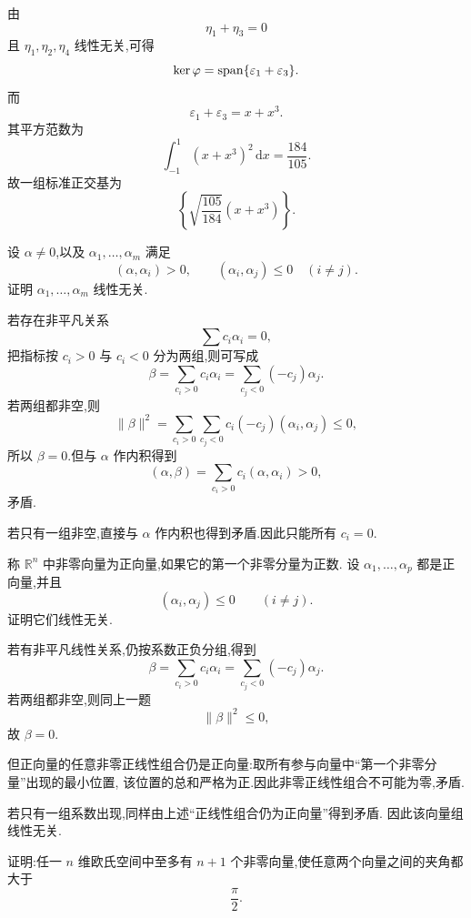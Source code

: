 \begin{solution}
由
\[
\eta_1+\eta_3=0
\]
且 $\eta_1,\eta_2,\eta_4$ 线性无关,可得
\[
\ker\varphi
=
\operatorname{span}\{\varepsilon_1+\varepsilon_3\}.
\]
而
\[
\varepsilon_1+\varepsilon_3=x+x^3.
\]
其平方范数为
\[
\displaystyle\int_{-1}^{1}(x+x^3)^2\,\mathrm{d}x
=
\dfrac{184}{105}.
\]
故一组标准正交基为
\[
\boxed{
\left\{
\sqrt{\dfrac{105}{184}}(x+x^3)
\right\}.
}
\]
\end{solution}


\begin{example}
设 $\alpha\neq0$,以及 $\alpha_1,\ldots,\alpha_m$ 满足
\[
(\alpha,\alpha_i)>0,
\qquad
(\alpha_i,\alpha_j)\le0\quad(i\neq j).
\]
证明 $\alpha_1,\ldots,\alpha_m$ 线性无关.
\end{example}
\exampleblank

\begin{solution}
若存在非平凡关系
\[
\displaystyle\sum c_i\alpha_i=0,
\]
把指标按 $c_i>0$ 与 $c_i<0$ 分为两组,则可写成
\[
\beta=
\sum_{c_i>0}c_i\alpha_i
=
\sum_{c_j<0}(-c_j)\alpha_j.
\]
若两组都非空,则
\[
\|\beta\|^2
=
\sum_{c_i>0}\sum_{c_j<0}
c_i(-c_j)(\alpha_i,\alpha_j)
\le0,
\]
所以 $\beta=0$.但与 $\alpha$ 作内积得到
\[
(\alpha,\beta)
=
\sum_{c_i>0}c_i(\alpha,\alpha_i)>0,
\]
矛盾.

若只有一组非空,直接与 $\alpha$ 作内积也得到矛盾.因此只能所有 $c_i=0$.
\end{solution}


\begin{example}
称 $\mathbb{R}^n$ 中非零向量为正向量,如果它的第一个非零分量为正数.
设 $\alpha_1,\ldots,\alpha_p$ 都是正向量,并且
\[
(\alpha_i,\alpha_j)\le0
\qquad(i\neq j).
\]
证明它们线性无关.
\end{example}
\exampleblank

\begin{solution}
若有非平凡线性关系,仍按系数正负分组,得到
\[
\beta=
\sum_{c_i>0}c_i\alpha_i
=
\sum_{c_j<0}(-c_j)\alpha_j.
\]
若两组都非空,则同上一题
\[
\|\beta\|^2\le0,
\]
故 $\beta=0$.

但正向量的任意非零正线性组合仍是正向量:取所有参与向量中``第一个非零分量''出现的最小位置,
该位置的总和严格为正.因此非零正线性组合不可能为零,矛盾.

若只有一组系数出现,同样由上述``正线性组合仍为正向量''得到矛盾.
因此该向量组线性无关.
\end{solution}


\begin{example}[\markstar]
证明:任一 $n$ 维欧氏空间中至多有 $n+1$ 个非零向量,使任意两个向量之间的夹角都大于
\[
\dfrac{\pi}{2}.
\]
\end{example}
\exampleblank

